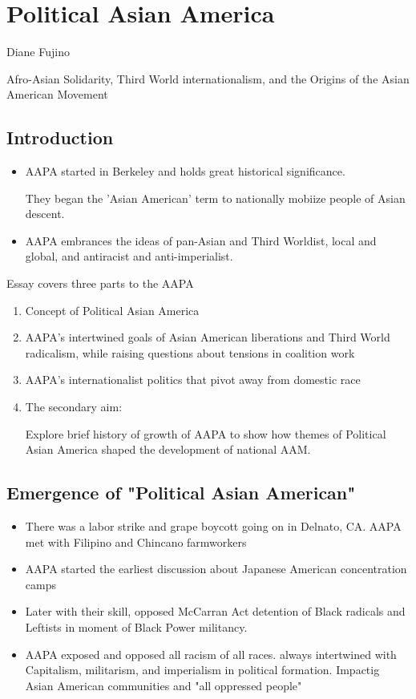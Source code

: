\documentclass{article}
\begin{document}
\section{Political Asian America}
Diane Fujino

Afro-Asian Solidarity, Third World internationalism, and the 
Origins of the Asian American Movement

\subsection{Introduction}
\begin{itemize}
  \item AAPA started in Berkeley and holds great historical significance.

    They began the 'Asian American' term to nationally
    mobiize people of Asian descent.
  \item AAPA embrances the ideas of pan-Asian and Third Worldist, local and global,
    and antiracist and anti-imperialist.
\end{itemize}

Essay covers three parts to the AAPA
\begin{enumerate}
  \item Concept of Political Asian America
  \item AAPA's intertwined goals of Asian American liberations
    and Third World radicalism,
    while raising questions about tensions in coalition work
  \item AAPA's internationalist politics that pivot away from domestic race
  \item The secondary aim:

    Explore brief history of growth of AAPA to show how themes
    of Political Asian America shaped the development of national AAM.

\end{enumerate}

\subsection{Emergence of "Political Asian American"}
\begin{itemize}
  \item There was a labor strike and grape boycott
    going on in Delnato, CA.
    AAPA met with Filipino and Chincano farmworkers
  \item AAPA started the earliest discussion about Japanese American concentration camps 
  \item Later with their skill, opposed McCarran Act detention
    of Black radicals and Leftists in moment of Black Power militancy.
  \item AAPA exposed and opposed all racism of all races.
    always intertwined with Capitalism, militarism, and imperialism in political formation.
    Impactig Asian American communities and "all oppressed people"
\end{itemize}
\end{document}

